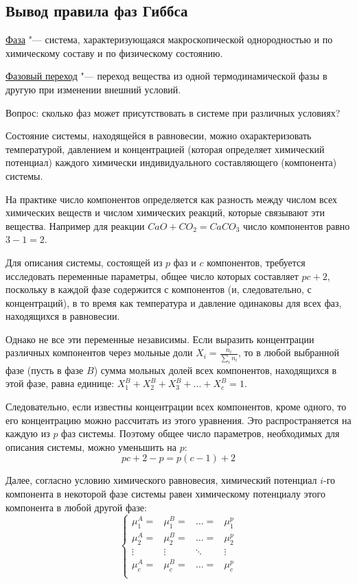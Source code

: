 \documentclass[12pt,a4paper,oneside]{book}
\begin{document}
\subsection{Вывод правила фаз Гиббса}

\underline{Фаза} "--- система, характеризующаяся макроскопической однородностью и по химическому составу и по физическому состоянию.

\underline{Фазовый переход} "--- переход вещества из одной термодинамической фазы в другую при изменении внешний условий.

Вопрос: сколько фаз может присутствовать в системе при различных условиях? 

Состояние системы, находящейся в равновесии, можно охарактеризовать температурой, давлением и концентрацией (которая определяет химический потенциал) каждого химически индивидуального составляющего (компонента) системы. 

На практике число компонентов определяется как разность между числом всех химических веществ и числом химических реакций, которые связывают эти вещества. Например для реакции $CaO + CO_2 = CaCO_3$  число компонентов равно $3 - 1 = 2$.

Для описания системы, состоящей из $p$ фаз и $c$ компонентов, требуется исследовать переменные параметры, общее число которых составляет $pc+2$, поскольку в каждой фазе содержится с компонентов (и, следовательно, с концентраций), в то время как температура и давление одинаковы для всех фаз, находящихся в равновесии.

Однако не все эти переменные независимы. Если выразить концентрации различных компонентов через мольные доли $X_i = \frac {n_i} {\sum \limits_i n_i}$, то в любой выбранной фазе (пусть в фазе $B$) сумма мольных долей всех компонентов, находящихся в этой фазе, равна единице: $X_1^B+X_2^B+X_3^B+...+X_c^B=1$.

Следовательно, если известны концентрации всех компонентов, кроме одного, то его концентрацию можно рассчитать из этого уравнения. Это распространяется на каждую из $p$ фаз системы. Поэтому общее число параметров, необходимых для описания системы, можно уменьшить на $p$:
\begin{equation}
	p c + 2 - p = p (c-1) + 2
\end{equation}

Далее, согласно условию химического равновесия, химический потенциал $i$-го компонента в некоторой фазе системы равен химическому потенциалу этого компонента в любой другой фазе:
\begin{equation}   
	\left\lbrace  \begin{array}{cccc}  
	\mu_1^A= & \mu_1^B= & \ldots=  & \mu_1^p\\  
	\mu_2^A= & \mu_2^B= & \ldots=  & \mu_2^p\\ 
	\vdots & \vdots & \ddots & \vdots \\  
	\mu_c^A= & \mu_c^B= & \ldots=  & \mu_c^p\\
	\end{array} \right.  
\end{equation}
\end{document}

